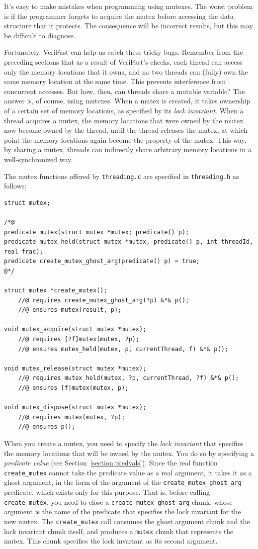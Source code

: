 \documentclass{article}
\begin{document}
It's easy to make mistakes when programming using mutexes. The
worst problem is if the programmer forgets to acquire the mutex
before accessing the data structure that it protects. The
consequence will be incorrect results, but this may be
difficult to diagnose.

Fortunately, VeriFast can help us catch these tricky bugs.
Remember from the preceding sections that as a result of
VeriFast's checks, each thread can access only the memory
locations that it owns, and no two threads can (fully) own the
same memory location at the same time. This prevents
interference from concurrent accesses. But how, then, can
threads share a mutable variable? The answer is, of course,
using mutexes. When a mutex is created, it takes ownership of a
certain set of memory locations, as specified by its \emph{lock
invariant}. When a thread acquires a mutex, the memory
locations that were owned by the mutex now become owned by the
thread, until the thread releases the mutex, at which point the
memory locations again become the property of the mutex. This
way, by sharing a mutex, threads can indirectly share arbitrary
memory locations in a well-synchronized way.

The mutex functions offered by \texttt{threading.c} are
specified in \texttt{threading.h} as follows:
\begin{lstlisting}
struct mutex;

/*@
predicate mutex(struct mutex *mutex; predicate() p);
predicate mutex_held(struct mutex *mutex, predicate() p, int threadId, real frac);
predicate create_mutex_ghost_arg(predicate() p) = true;
@*/

struct mutex *create_mutex();
    //@ requires create_mutex_ghost_arg(?p) &*& p();
    //@ ensures mutex(result, p);

void mutex_acquire(struct mutex *mutex);
    //@ requires [?f]mutex(mutex, ?p);
    //@ ensures mutex_held(mutex, p, currentThread, f) &*& p();

void mutex_release(struct mutex *mutex);
    //@ requires mutex_held(mutex, ?p, currentThread, ?f) &*& p();
    //@ ensures [f]mutex(mutex, p);

void mutex_dispose(struct mutex *mutex);
    //@ requires mutex(mutex, ?p);
    //@ ensures p();
\end{lstlisting}

When you create a mutex, you need to specify the \emph{lock
invariant} that specifies the memory locations that will be
owned by the mutex. You do so by specifying a \emph{predicate
value} (see Section~\ref{section:predvals}). Since the real
function \lstinline!create_mutex! cannot take the predicate
value as a real argument, it takes it as a ghost argument, in
the form of the argument of the
\lstinline!create_mutex_ghost_arg! predicate, which exists only
for this purpose. That is, before calling
\lstinline!create_mutex!, you need to close a
\lstinline!create_mutex_ghost_arg! chunk, whose argument is the
name of the predicate that specifies the lock invariant for the
new mutex. The \lstinline!create_mutex! call consumes the ghost
argument chunk and the lock invariant chunk itself, and
produces a \lstinline!mutex! chunk that represents the mutex.
This chunk specifies the lock invariant as its second argument.
\end{document}
